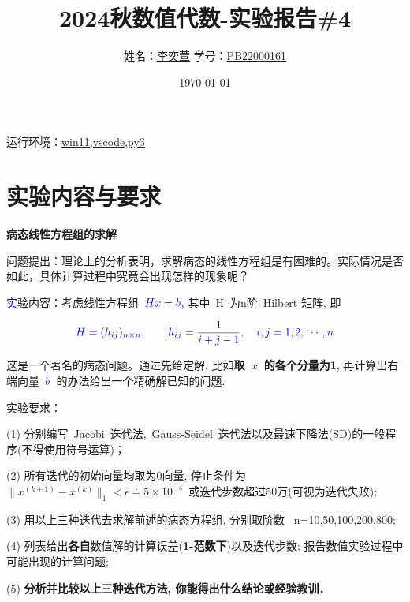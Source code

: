 \documentclass[12pt]{article}
\begin{document}
\title{\huge{\textbf{2024秋数值代数-实验报告\#4}}}
\author{姓名：\underline{李奕萱} \hspace{1cm}学号：\underline{PB22000161} }
\date{\today}

\maketitle

运行环境：\underline{win11,vscode,py3}

\section{实验内容与要求}
\bf 
{病态线性方程组的求解}


问题提出：理论上的分析表明，求解病态的线性方程组是有困难的。实际情况是否如此，具体计算过程中究竟会出现怎样的现象呢？

{\textcolor{blue}实验内容}：考虑线性方程组~$\textcolor{blue}{Hx = b}$, 其中~H~为n阶~{\color{blue}Hilbert 矩阵}, 即

$$\textcolor{blue}{ H=(h_{ij})_{n\times n}, \qquad  h_{ij}=\frac{1}{i+j-1},\quad i,j=1,2,\cdots,n  }$$

这是一个著名的病态问题。通过先给{\color{blue}定解}, 比如{\color{red}\bf 取~$x$~的各个分量为1}, 再计算出右端向量~$\color{blue}b$~的办法给出一个精确解已知的问题.

{\color{blue} 实验要求}：

(1) 分别编写~Jacobi~迭代法,~Gauss-Seidel~迭代法以及最速下降法(SD)的一般程序({\color{red}不得使用符号运算})；

(2) 所有迭代的{\color{red}初始向量均取为0向量, 停止条件为~$\|x^{(k+1)}  - x^{(k)} \|_1 < \epsilon \doteq 5\times 10^{-4}$~或迭代步数超过50万(可视为迭代失败)};

(3) 用以上三种迭代去求解前述的病态方程组,
分别取阶数~{\color{red} n=10,50,100,200,800};

(4) 列表给出{\bf 各自}{\color{blue}数值解}的计算误差({\bf\color{red}1-范数下})以及迭代步数;
    报告数值实验过程中可能出现的计算问题;

%
(5) {\bf 分析并比较以上三种迭代方法, 你能得出什么结论或经验教训．}
\clearpage
\end{document}
